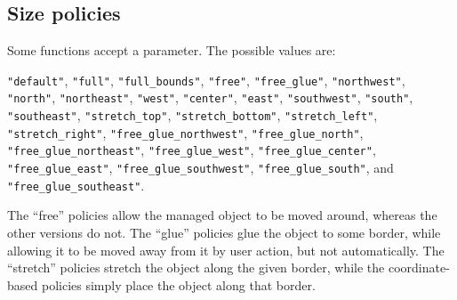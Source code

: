 
\subsection{Size policies}
\label{sec:sizepolicies}

Some functions accept a  parameter. The possible
values are: 

\begin{flushleft}
\verb!"default"!,
\verb!"full"!,
\verb!"full_bounds"!,
\verb!"free"!,
\verb!"free_glue"!,
\verb!"northwest"!,
\verb!"north"!,
\verb!"northeast"!,
\verb!"west"!,
\verb!"center"!,
\verb!"east"!,
\verb!"southwest"!,
\verb!"south"!,
\verb!"southeast"!,
\verb!"stretch_top"!,
\verb!"stretch_bottom"!,
\verb!"stretch_left"!,
\verb!"stretch_right"!,
\verb!"free_glue_northwest"!,
\verb!"free_glue_north"!,
\verb!"free_glue_northeast"!,
\verb!"free_glue_west"!,
\verb!"free_glue_center"!,
\verb!"free_glue_east"!,
\verb!"free_glue_southwest"!,
\verb!"free_glue_south"!, and
\verb!"free_glue_southeast"!.
\end{flushleft}

The ``free'' policies allow the managed
object to be moved around, whereas the other versions do not. 
The ``glue'' policies glue the object to some border, while allowing
it to be moved away from it by user action, but not automatically.
The ``stretch'' policies stretch the object along the given border,
while the coordinate-based policies simply place the object along 
that border.
